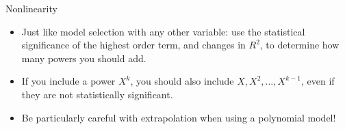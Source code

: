 \documentclass{beamer}\usepackage[]{graphicx}\usepackage[]{color}
\makeatletter
\newcommand{\hlnum}[1]{\textcolor[rgb]{0.824,0.412,0.118}{#1}}%
\newcommand{\hlopt}[1]{\textcolor[rgb]{1,0.894,0.769}{#1}}%
\newcommand{\hlstd}[1]{\textcolor[rgb]{1,0.894,0.769}{#1}}%
\newcommand{\hlkwb}[1]{\textcolor[rgb]{0.804,0.776,0.451}{#1}}%
\newcommand{\hlkwc}[1]{\textcolor[rgb]{0.78,0.941,0.545}{#1}}%
\newcommand{\hlkwd}[1]{\textcolor[rgb]{1,0.78,0.769}{#1}}%
\newenvironment{kframe}{%
 \def\at@end@of@kframe{}%
 \ifinner\ifhmode%
  \def\at@end@of@kframe{\end{minipage}}%
  \begin{minipage}{\columnwidth}%
 \fi\fi%
 \def\FrameCommand##1{\hskip\@totalleftmargin \hskip-\fboxsep
 \colorbox{shadecolor}{##1}\hskip-\fboxsep
     \hskip-\linewidth \hskip-\@totalleftmargin \hskip\columnwidth}%
 \MakeFramed {\advance\hsize-\width
   \@totalleftmargin\z@ \linewidth\hsize
   \@setminipage}}%
 {\par\unskip\endMakeFramed%
 \at@end@of@kframe}
\newenvironment{knitrout}{}{} %
\makeatother
\begin{document}
\begin{darkframes}
\begin{frame}[fragile]
\begin{knitrout}
\end{knitrout}
    \end{frame}


    \begin{frame}{Nonlinearity}
      \begin{itemize}
        \item Just like model selection with any other variable: use the statistical significance of the highest order term, and changes in $R^2$, to determine how many powers you should add.
        \item If you include a power $X^k$, you should also include $X, X^2, \ldots, X^{k-1}$, even if they are not statistically significant.
        \item Be particularly careful with extrapolation when using a polynomial model!
      \end{itemize}
    \end{frame}

  \end{darkframes}

  
\end{document}
